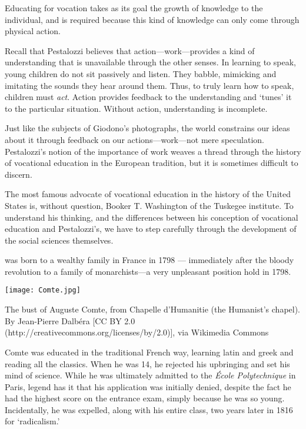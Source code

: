 \begin{purpose}\label{def:forvocation-pestalozzi}
Educating for vocation takes as its goal the growth of knowledge to the individual, and is required because this kind of knowledge can only come through physical action.
\end{purpose}

Recall that Pestalozzi believes that action---work---provides a kind of understanding that is unavailable through the other senses. In learning to speak, young children do not sit passively and listen. They babble, mimicking and imitating the sounds they hear around them. Thus, to truly learn how to speak, children must \emph{act}. Action provides feedback to the understanding and `tunes' it to the particular situation. Without action, understanding is incomplete.

Just like the subjects of Giodono's photographs, the world constrains our ideas about it through feedback on our actions---work---not mere speculation. Pestalozzi's notion of the importance of work weaves a thread through the history of vocational education in the European tradition, but it is sometimes difficult to discern. 

The most famous advocate of vocational education in the history of the United States is, without question, Booker T. Washington of the Tuskegee institute. To understand his thinking, and the differences between his conception of vocational education and Pestalozzi's, we have to step carefully through the development of the social sciences themselves.

 was born to a wealthy family in France in 1798 --- immediately after the bloody revolution to a family of monarchists---a very unpleasant position hold in 1798.
\begin{marginfigure}\texttt{[image: Comte.jpg]}\caption{The bust of Auguste Comte, from Chapelle d'Humanitie (the Humanist's chapel). By Jean-Pierre Dalbéra [CC BY 2.0 (http://creativecommons.org/licenses/by/2.0)], via Wikimedia Commons}\end{marginfigure}
Comte was educated in the traditional French way, learning latin and greek and reading all the classics. When he was 14, he rejected his upbringing and set his mind of science. While he was ultimately admitted to the \emph{École Polytechnique} in Paris, legend has it that his application was initially denied, despite the fact he had the highest score on the entrance exam, simply because he was so young. Incidentally, he was expelled, along with his entire class, two years later in 1816 for `radicalism.'

